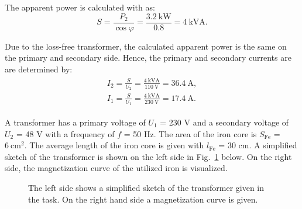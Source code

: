 \begin{solutionblock}
  
  The apparent power is calculated with as:
  \begin{equation}
    S = \frac{P_{\mathrm{2}}}{\cos \varphi}
    = \frac{\SI{3.2}{\kilo \watt}}{0.8}
    = \SI{4}{\kilo\volt\ampere}.
  \end{equation}

  Due to the loss-free transformer, the calculated apparent power is the same on the primary and secondary side. Hence, the primary and secondary currents are are determined by:
  \begin{align}
    \begin{split}
      I_{\mathrm{2}} = \frac{S}{U_{\mathrm{2}}}
      = \frac{\SI{4}{\kilo\volt\ampere}}{\SI{110}{\volt}}
      = \SI{36.4}{\ampere}, \\
      I_{\mathrm{1}} = \frac{S}{U_{\mathrm{1}}}
      = \frac{\SI{4}{\kilo\volt\ampere}}{\SI{230}{\volt}}
      = \SI{17.4}{\ampere}.
    \end{split}
  \end{align}
\end{solutionblock}







A transformer has a primary voltage of $U_{\mathrm{1}}$ = 230 V and a secondary voltage of $U_{\mathrm{2}}$ = 48 V with a frequency of $f$ = 50 Hz. The area of the iron core is $S_{\mathrm{Fe}}$ = $\SI{6}{\centi \metre \squared}$. The average length of the iron core is given with $l_{\mathrm{Fe}}$ = 30 cm. A simplified sketch of the transformer is shown on the left side in Fig.~\ref{fig:transformer_magnetizationCurrent} below. On the right side, the magnetization curve of the utilized iron is visualized.

\begin{figure}[htb]
  \centering
  
  \caption{The left side shows a simplified sketch of the transformer given in the task. On the right hand side a magnetization curve is given.}
  \label{fig:transformer_magnetizationCurrent}
\end{figure}




